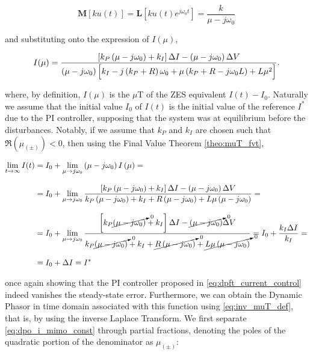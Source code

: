 \begin{equation} \mathbf{M}\left[ku(t)\right] = \mathbf{L}\left[ku(t)e^{j\omega_0t}\right] = \dfrac{k}{\mu - j\omega_0}\end{equation}

	\noindent and substituting onto the expression of $I(\mu)$,

\begin{equation}
	I(\mu) = \dfrac{\left[k_P\left(\mu - j\omega_0\right) + k_I\right]\Delta I - \left(\mu - j\omega_0\right) \Delta V}{\left(\mu - j\omega_0\right)\left[\raisebox{4mm}{} k_I - j \left(k_P + R\right) \omega_0 + \mu\left(k_P + R - j\omega_0 L\right) + L\mu^2\right] } .\label{eq:dpo_i_mimo_const}
\end{equation}

	\noindent where, by definition, $I(\mu)$ is the $\mu$T of the ZES equivalent $I(t) - I_0$. Naturally we assume that the initial value $I_0$ of $I(t)$ is the initial value of the reference $I^*$ due to the PI controller, supposing that the system was at equilibrium before the disturbances. Notably, if we assume that $k_P$ and $k_I$ are chosen such that $\Re\left(\mu_{(\pm)}\right) < 0$, then using the Final Value Theorem \ref{theo:muT_fvt},

\begin{align}
	\lim\limits_{t\to\infty} I(t) &= I_0 + \lim\limits_{\mu\to j\omega_0} \left(\mu - j\omega_0\right) I\left(\mu\right) = \nonumber\\[3mm]
%
	&= I_0 + \lim\limits_{\mu\to j\omega_0} \dfrac{\left[k_P\left(\mu - j\omega_0\right) + k_I\right]\Delta I - \left(\mu - j\omega_0\right) \Delta V}{k_P\left(\mu - j\omega_0\right) + k_I  + R\left(\mu - j\omega_0\right) + L\mu\left(\mu - j\omega_0\right)} = \nonumber\\[3mm]
%
	&= I_0 + \lim\limits_{\mu\to j\omega_0} \dfrac{\left[k_P\cancelto{0}{\left(\mu - j\omega_0\right)} + k_I\right]\Delta I - \cancelto{0}{\left(\mu - j\omega_0\right)} \Delta V}{k_P\cancelto{0}{\left(\mu - j\omega_0\right)} + k_I + \cancelto{0}{R\left(\mu - j\omega_0\right)} + \cancelto{0}{L\mu\left(\mu - j\omega_0\right)}} = I_0 + \dfrac{k_I \Delta I}{k_I} = \nonumber\\[3mm]
%
	&= I_0 + \Delta I = I^* \label{eq:dpo_i_mimo_const}
\end{align}

	\noindent once again showing that the PI controller proposed in \eqref{eq:dpft_current_control} indeed vanishes the steady-state error. Furthermore, we can obtain the Dynamic Phasor in time domain associated with this function using \eqref{eq:inv_muT_def}, that is, by using the inverse Laplace Transform. We first separate \eqref{eq:dpo_i_mimo_const} through partial fractions, denoting the poles of the quadratic portion of the denominator as $\mu_{(\pm)}$:

